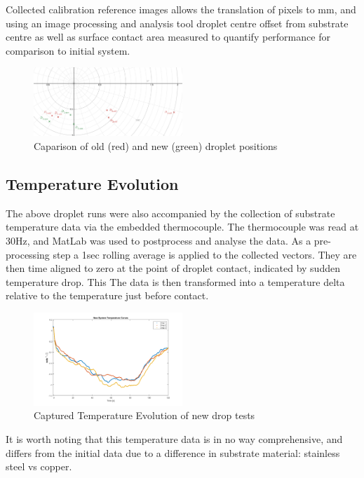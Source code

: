 Collected calibration reference images allows the translation of pixels to mm, and using an image processing and analysis tool droplet centre offset from substrate centre as well as surface contact area measured to quantify performance for comparison to initial system.

\begin{figure}[h]
    \centering
    \includegraphics[width=0.5\textwidth]{img/pos_comp.png}
    \caption{Caparison of old (red) and new (green) droplet positions}
\end{figure}

\subsection{Temperature Evolution}

The above droplet runs were also accompanied by the collection of substrate temperature data via the embedded thermocouple. The thermocouple was read at 30Hz, and MatLab was used to postprocess and analyse the data. As a pre-processing step a 1sec rolling average is applied to the collected vectors. They are then time aligned to zero at the point of droplet contact, indicated by sudden temperature drop. This The data is then transformed into a temperature delta relative to the temperature just before contact. 

\begin{figure}[h]
    \centering
    \includegraphics[width=0.5\textwidth]{img/new_temp.png}
    \caption{Captured Temperature Evolution of new drop tests}
\end{figure}

It is worth noting that this temperature data is in no way comprehensive, and differs from the initial data due to a difference in substrate material: stainless steel vs copper. 

